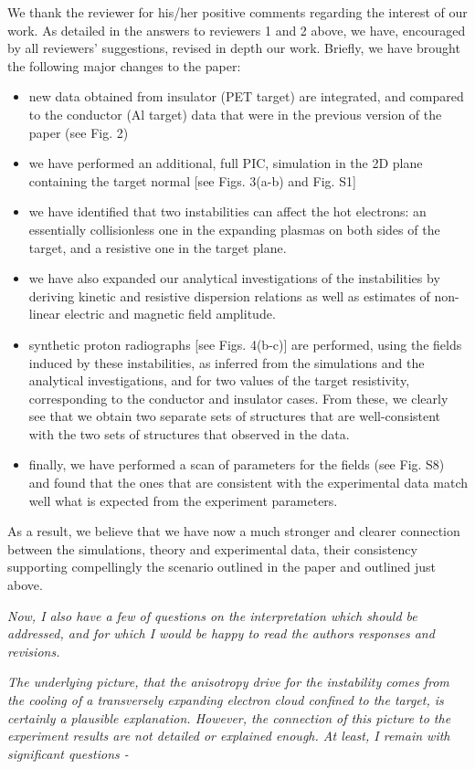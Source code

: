 \documentclass[aps,showpacs,superscriptaddress]{revtex4}%
\begin{document}
We thank the reviewer for his/her positive comments regarding the interest of our work. As detailed in the answers to reviewers 1 and 2 above, we have, encouraged by all reviewers’ suggestions, revised in depth our work.
Briefly, we have brought the following major changes to the paper:
\begin{itemize}
    \item new data obtained from insulator (PET target) are integrated, and compared to the conductor (Al target) data that were in the previous version of the paper (see Fig. 2)
    \item we have performed an additional, full PIC, simulation in the 2D plane containing the target normal [see Figs. 3(a-b) and Fig. S1]
    \item we have identified that two instabilities can affect the hot electrons: an essentially  collisionless one in the expanding plasmas on both sides of the target, and a resistive one in the target plane. 
    \item we have also expanded our analytical investigations of the instabilities by deriving kinetic and resistive dispersion relations as well as  estimates of    non-linear electric and magnetic field amplitude.
    \item synthetic proton radiographs [see Figs. 4(b-c)] are performed, using the fields induced by these instabilities, as inferred from the simulations and the analytical investigations, and for two values of the target resistivity, corresponding to the conductor and insulator cases. From these, we clearly see that we obtain two separate sets of structures that are well-consistent with the two sets of structures that observed in the data. 
    \item finally, we have performed a scan of parameters for the fields (see Fig. S8) and found that the ones that are consistent with the experimental data match well what is expected from the experiment parameters. 
\end{itemize}

As a result, we believe that we have now a much stronger and clearer connection between the simulations, theory and experimental data, their consistency supporting compellingly the scenario outlined in the paper and outlined just above.

\textit{
Now, I also have a few of questions on the interpretation which should be addressed, and for which I would be happy to read the authors responses and revisions.}

\textit{
The underlying picture, that the anisotropy drive for the instability comes from the cooling of a transversely expanding electron cloud confined to the target, is certainly a plausible explanation. However, the connection of this picture to the experiment results are not detailed or explained enough. At least, I remain with significant questions -}
\end{document}
